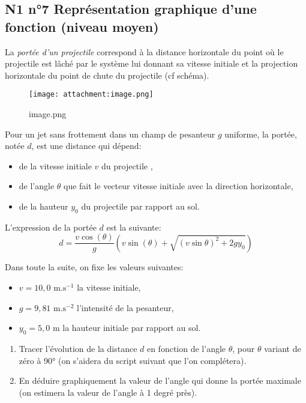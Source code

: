 \documentclass[11pt]{article}
\providecommand{\tightlist}{%
      \setlength{\itemsep}{0pt}\setlength{\parskip}{0pt}}
\begin{document}
    \hypertarget{n1-n7-repruxe9sentation-graphique-dune-fonction-niveau-moyen}{%
\subsection{N1 n°7 Représentation graphique d'une fonction (niveau
moyen)}\label{n1-n7-repruxe9sentation-graphique-dune-fonction-niveau-moyen}}

La \emph{portée d'un projectile} correspond à la distance horizontale du
point où le projectile est lâché par le système lui donnant sa vitesse
initiale et la projection horizontale du point de chute du projectile
(cf schéma).

\begin{figure}
\centering
\texttt{[image: attachment:image.png]}
\caption{image.png}
\end{figure}

Pour un jet sans frottement dans un champ de pesanteur \(g\) uniforme,
la portée, notée \(d\), est une distance qui dépend:

\begin{itemize}
\tightlist
\item
  de la vitesse initiale \(v\) du projectile ,
\item
  de l'angle \(\theta\) que fait le vecteur vitesse initiale avec la
  direction horizontale,
\item
  de la hauteur \(y_0\) du projectile par rapport au sol.
\end{itemize}

L'expression de la portée \(d\) est la suivante:
\[d=\frac{v\cos(\theta)}{g} \left(v\sin(\theta)+\sqrt{(v\sin\theta)^2+2gy_0}\right)\]

Dans toute la suite, on fixe les valeurs suivantes:

\begin{itemize}
\tightlist
\item
  \(v=10,0 \textrm{ m.s}^{-1}\) la vitesse initiale,
\item
  \(g=9,81 \textrm{ m.s}^{-2}\) l'intensité de la pesanteur,
\item
  \(y_0 = 5,0 \textrm{ m}\) la hauteur initiale par rapport au sol.
\end{itemize}

\begin{enumerate}
\def\labelenumi{\alph{enumi})}
\item
  Tracer l'évolution de la distance \(d\) en fonction de l'angle
  \(\theta\), pour \(\theta\) variant de zéro à 90° (on s'aidera du
  script suivant que l'on complétera).
\item
  En déduire graphiquement la valeur de l'angle qui donne la portée
  maximale (on estimera la valeur de l'angle à 1 degré près).
\end{enumerate}
\end{document}
